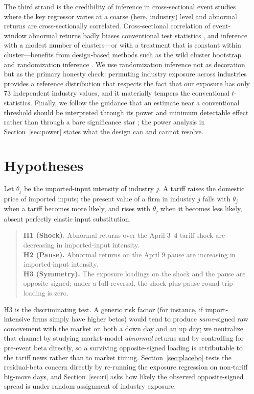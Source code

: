 \documentclass[12pt]{article}
\begin{document}
The third strand is the credibility of inference in cross-sectional event studies where the
key regressor varies at a coarse (here, industry) level and abnormal returns are
cross-sectionally correlated. Cross-sectional correlation of event-window abnormal returns
badly biases conventional test statistics \citep{kolari2010}, and inference with a modest
number of clusters---or with a treatment that is constant within cluster---benefits from
design-based methods such as the wild cluster bootstrap \citep{cameron2008} and randomization
inference \citep{young2019}. We use randomization inference not as decoration but as the
primary honesty check: permuting industry exposure across industries provides a reference
distribution that respects the fact that our exposure has only 73 independent industry values,
and it materially tempers the conventional $t$-statistics. Finally, we follow the guidance that
an estimate near a conventional threshold should be interpreted through its power and minimum
detectable effect rather than through a bare significance star \citep{abadie2020}; the power
analysis in Section~\ref{sec:power} states what the design can and cannot resolve.

\section{Hypotheses}\label{sec:hyp}
Let $\theta_j$ be the imported-input intensity of industry $j$. A tariff raises the
domestic price of imported inputs; the present value of a firm in industry $j$ falls with
$\theta_j$ when a tariff becomes more likely, and rises with $\theta_j$ when it becomes less
likely, absent perfectly elastic input substitution.
\begin{quote}
\textbf{H1 (Shock).} Abnormal returns over the April 3--4 tariff shock are decreasing in
imported-input intensity.\\
\textbf{H2 (Pause).} Abnormal returns on the April 9 pause are increasing in imported-input
intensity.\\
\textbf{H3 (Symmetry).} The exposure loadings on the shock and the pause are opposite-signed;
under a full reversal, the shock-plus-pause round-trip loading is zero.
\end{quote}
H3 is the discriminating test. A generic risk factor (for instance, if import-intensive
firms simply have higher betas) would tend to produce \emph{same}-signed raw comovement
with the market on both a down day and an up day; we neutralize that channel by studying
market-model \emph{abnormal} returns and by controlling for pre-event beta directly, so a
surviving opposite-signed loading is attributable to the tariff news rather than to market
timing. Section~\ref{sec:placebo} tests the residual-beta concern directly by re-running the
exposure regression on non-tariff big-move days, and Section~\ref{sec:ri} asks how likely the
observed opposite-signed spread is under random assignment of industry exposure.
\end{document}
